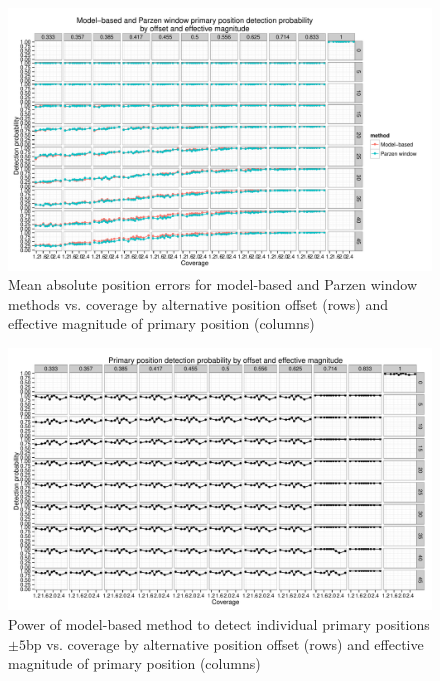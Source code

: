 \begin{figure}
\centering
\includegraphics[page=5,width=0.95\textheight]{figures/nucleosomes/plots_compare_power}
\caption{Mean absolute position errors for model-based and Parzen window methods vs. coverage by alternative position offset (rows) and effective magnitude of primary position (columns)}
\end{figure}




\begin{figure}
\centering
\includegraphics[page=1,width=0.95\textheight]{figures/nucleosomes/plots_power_pm3}
\caption{Power of model-based method to detect individual primary positions $\pm 5$bp vs. coverage by alternative position offset (rows) and effective magnitude of primary position (columns)}
\end{figure}

